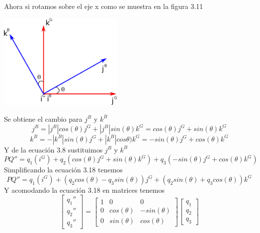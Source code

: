 Ahora si rotamos sobre el eje x como se muestra en la figura 3.11
\begin{center}
	\includegraphics[width=0.45\textwidth]{Contenido/Cuerpo/Capitulo3/Fig17.eps}
	\label{fig:ModeloMat:Fig1}
\end{center}
Se obtiene el cambio para $j^B$ y $k^B$
\begin{equation}
	j^B = |j^B|cos(\theta)j^G + |j^B|sin(\theta)k^G = cos(\theta)j^G + sin(\theta)k^G
\end{equation}
\begin{equation}
	k^B = -|k^B|sin(\theta)j^G + |k^B|cos\theta)k^G = -sin(\theta)j^G + cos(\theta)k^G
\end{equation}
Y de la ecuación 3.8 sustituimos $j^B$ y $k^B$
\begin{equation}
	PQ'' = q_1(i^G) + q_2(cos(\theta)j^G + sin(\theta)k^G) + q_3(-sin(\theta)j^G + cos(\theta)k^G)
\end{equation}
Simplificando la ecuación 3.18 tenemos
\begin{equation}
	PQ''= q_1(i^G) + (q_2cos(\theta) - q_3sin(\theta))j^G + (q_2sin(\theta) + q_3cos(\theta))k^G
\end{equation}
Y acomodando la ecuación 3.18 en matrices tenemos
\begin{equation}
	\begin{bmatrix}
		q_1'' \\
		q_2'' \\
		q_3''
	\end{bmatrix}
	=
	\begin{bmatrix}
		1 & 0           & 0            \\
		0 & cos(\theta) & -sin(\theta) \\
		0 & sin(\theta) & cos(\theta)
	\end{bmatrix}
	\begin{bmatrix}
		q_1 \\
		q_2 \\
		q_3
	\end{bmatrix}
\end{equation}

